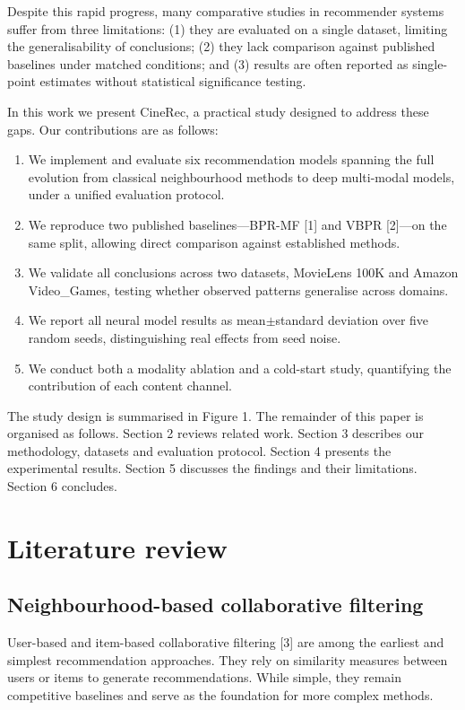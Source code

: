 \documentclass[11pt,a4paper]{article}
\begin{document}
Despite this rapid progress, many comparative studies in recommender systems
suffer from three limitations: (1) they are evaluated on a single dataset,
limiting the generalisability of conclusions; (2) they lack comparison against
published baselines under matched conditions; and (3) results are often
reported as single-point estimates without statistical significance testing.

In this work we present CineRec, a practical study designed to address these
gaps. Our contributions are as follows:

\begin{enumerate}[leftmargin=2em,itemsep=1pt,topsep=3pt]
  \item We implement and evaluate six recommendation models spanning the full
        evolution from classical neighbourhood methods to deep multi-modal
        models, under a unified evaluation protocol.
  \item We reproduce two published baselines---BPR-MF [1] and VBPR [2]---on the
        same split, allowing direct comparison against established methods.
  \item We validate all conclusions across two datasets, MovieLens 100K and
        Amazon Video\_Games, testing whether observed patterns generalise
        across domains.
  \item We report all neural model results as mean$\pm$standard deviation over
        five random seeds, distinguishing real effects from seed noise.
  \item We conduct both a modality ablation and a cold-start study, quantifying
        the contribution of each content channel.
\end{enumerate}

The study design is summarised in Figure 1. The remainder of this paper is
organised as follows. Section 2 reviews related work. Section 3 describes our
methodology, datasets and evaluation protocol. Section 4 presents the
experimental results. Section 5 discusses the findings and their limitations.
Section 6 concludes.

\section{Literature review}
\subsection{Neighbourhood-based collaborative filtering}
User-based and item-based collaborative filtering [3] are among the earliest and
simplest recommendation approaches. They rely on similarity measures between
users or items to generate recommendations. While simple, they remain
competitive baselines and serve as the foundation for more complex methods.
\end{document}
